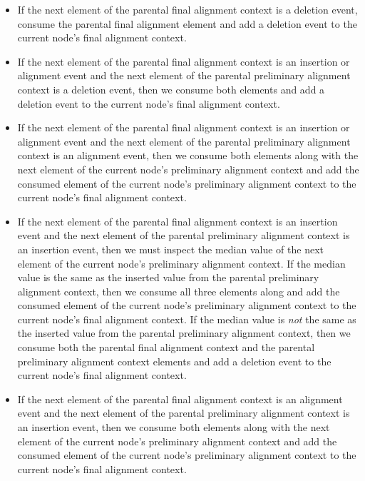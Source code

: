 \documentclass[11pt]{article}
\begin{document}
\begin{itemize}

\item If the next element of the parental final alignment context is a deletion event, consume the parental final alignment element and add a deletion event to the current node's final alignment context.

\item If the next element of the parental final alignment context is an insertion or alignment event and the next element of the parental preliminary alignment context is a deletion event, then we consume both elements and add a deletion event to the current node's final alignment context.

\item If the next element of the parental final alignment context is an insertion or alignment event and the next element of the parental preliminary alignment context is an alignment event, then we consume both elements along with the next element of the current node's preliminary alignment context and add the consumed element of the current node's preliminary alignment context to the current node's final alignment context.

\item If the next element of the parental final alignment context is an insertion event and the next element of the parental preliminary alignment context is an insertion event, then we must inspect the median value of the next element of the current node's preliminary alignment context. If the median value is the same as the inserted value from the parental preliminary alignment context, then we consume all three elements along and add the consumed element of the current node's preliminary alignment context to the current node's final alignment context. If the median value is \textit{not} the same as the inserted value from the parental preliminary alignment context, then we consume both the parental final alignment context and the parental preliminary alignment context elements and add a deletion event to the current node's final alignment context.

\item If the next element of the parental final alignment context is an alignment event and the next element of the parental preliminary alignment context is an insertion event, then we consume both elements along with the next element of the current node's preliminary alignment context and add the consumed element of the current node's preliminary alignment context to the current node's final alignment context.

\end{itemize}
\end{document}
